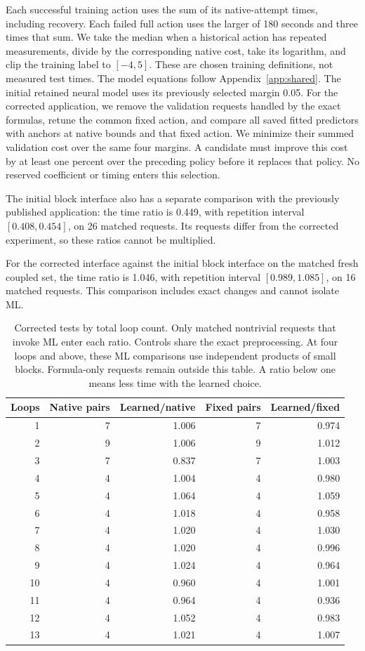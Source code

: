 Each successful training action uses the sum of its native-attempt times, including recovery. Each failed full action uses the larger of 180 seconds and three times that sum. We take the median when a historical action has repeated measurements, divide by the corresponding native cost, take its logarithm, and clip the training label to $[-4,5]$. These are chosen training definitions, not measured test times. The model equations follow Appendix~\ref{app:shared}. The initial retained neural model uses its previously selected margin 0.05. For the corrected application, we remove the validation requests handled by the exact formulas, retune the common fixed action, and compare all saved fitted predictors with anchors at native bounds and that fixed action. We minimize their summed validation cost over the same four margins. A candidate must improve this cost by at least one percent over the preceding policy before it replaces that policy. No reserved coefficient or timing enters this selection.

The initial block interface also has a separate comparison with the previously published application: the time ratio is 0.449, with repetition interval $[0.408,0.454]$, on 26 matched requests. Its requests differ from the corrected experiment, so these ratios cannot be multiplied.

For the corrected interface against the initial block interface on the matched fresh coupled set, the time ratio is 1.046, with repetition interval $[0.989,1.085]$, on 16 matched requests. This comparison includes exact changes and cannot isolate ML.

\begin{table}[!htbp]\centering\small
\caption{Corrected tests by total loop count. Only matched nontrivial requests that invoke ML enter each ratio. Controls share the exact preprocessing. At four loops and above, these ML comparisons use independent products of small blocks. Formula-only requests remain outside this table. A ratio below one means less time with the learned choice.}
\begin{tabular}{rrrrr}\toprule
Loops & Native pairs & Learned/native & Fixed pairs & Learned/fixed\\\midrule
1 & 7 & 1.006 & 7 & 0.974\\
2 & 9 & 1.006 & 9 & 1.012\\
3 & 7 & 0.837 & 7 & 1.003\\
4 & 4 & 1.004 & 4 & 0.980\\
5 & 4 & 1.064 & 4 & 1.059\\
6 & 4 & 1.018 & 4 & 0.958\\
7 & 4 & 1.020 & 4 & 1.030\\
8 & 4 & 1.020 & 4 & 0.996\\
9 & 4 & 1.024 & 4 & 0.964\\
10 & 4 & 0.960 & 4 & 1.001\\
11 & 4 & 0.964 & 4 & 0.936\\
12 & 4 & 1.052 & 4 & 0.983\\
13 & 4 & 1.021 & 4 & 1.007\\
\bottomrule\end{tabular}\end{table}
